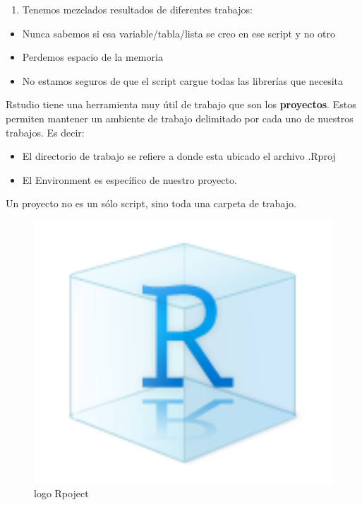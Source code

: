 \documentclass[]{book}
\providecommand{\tightlist}{%
  \setlength{\itemsep}{0pt}\setlength{\parskip}{0pt}}
\begin{document}
\begin{enumerate}
\def\labelenumi{\arabic{enumi}.}
\setcounter{enumi}{1}
\tightlist
\item
  Tenemos mezclados resultados de diferentes trabajos:
\end{enumerate}

\begin{itemize}
\tightlist
\item
  Nunca sabemos si esa variable/tabla/lista se creo en ese script y no otro
\item
  Perdemos espacio de la memoria
\item
  No estamos seguros de que el script cargue todas las librerías que necesita
\end{itemize}

Rstudio tiene una herramienta muy útil de trabajo que son los \textbf{proyectos}. Estos permiten mantener un ambiente de trabajo delimitado por cada uno de nuestros trabajos. Es decir:

\begin{itemize}
\tightlist
\item
  El directorio de trabajo se refiere a donde esta ubicado el archivo .Rproj
\item
  El Environment es específico de nuestro proyecto.
\end{itemize}

Un proyecto no es un sólo script, sino toda una carpeta de trabajo.

\begin{figure}
\centering
\includegraphics[width=10.41667in,height=\textheight]{img/Rproject.png}
\caption{logo Rpoject}
\end{figure}
\end{document}
